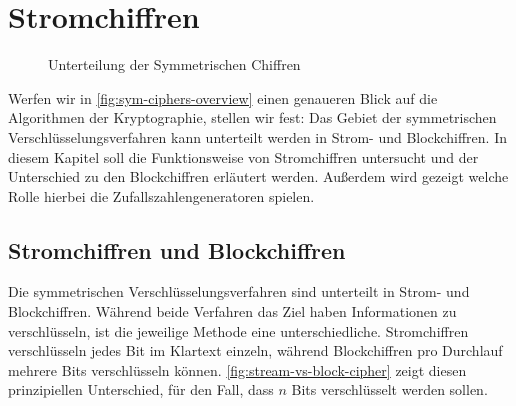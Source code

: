 \chapter{Stromchiffren}

\begin{figure}[h]
  \centering
  \caption{Unterteilung der Symmetrischen Chiffren \parencite[29]{BOOK:crypto}}
  \label{fig:sym-ciphers-overview}
\end{figure}

\noindent
Werfen wir in \autoref{fig:sym-ciphers-overview} einen genaueren Blick auf die Algorithmen
der Kryptographie, stellen wir fest: Das Gebiet
der symmetrischen Verschlüsselungsverfahren kann unterteilt werden in Strom- und Blockchiffren.
In diesem Kapitel soll die Funktionsweise von Stromchiffren untersucht und der Unterschied zu
den Blockchiffren erläutert werden. Außerdem wird gezeigt welche
Rolle hierbei die Zufallszahlengeneratoren spielen.

\section{Stromchiffren und Blockchiffren}
Die symmetrischen Verschlüsselungsverfahren sind unterteilt in Strom- und Blockchiffren.
Während beide Verfahren das Ziel haben Informationen zu verschlüsseln, ist die jeweilige
Methode eine unterschiedliche. Stromchiffren verschlüsseln jedes Bit im Klartext einzeln,
während Blockchiffren pro Durchlauf mehrere Bits verschlüsseln können.
\autoref{fig:stream-vs-block-cipher} zeigt diesen prinzipiellen Unterschied, für den Fall, dass
$n$ Bits verschlüsselt werden sollen.

